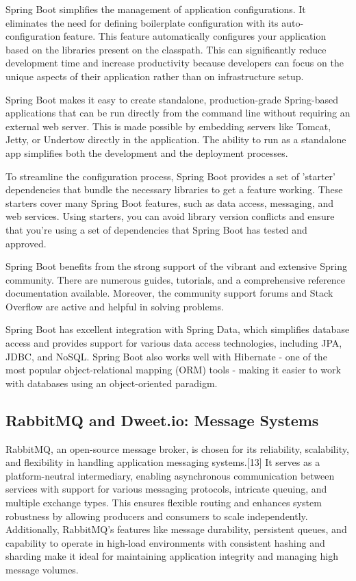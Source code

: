 Spring Boot simplifies the management of application configurations. 
It eliminates the need for defining boilerplate configuration with its auto-configuration feature.
This feature automatically configures your application based on the libraries present on the classpath. 
This can significantly reduce development time and increase productivity because developers can focus on the unique aspects of their application rather than on infrastructure setup. 

Spring Boot makes it easy to create standalone, production-grade Spring-based applications that can be run directly from the command line without requiring an external web server. 
This is made possible by embedding servers like Tomcat, Jetty, or Undertow directly in the application. 
The ability to run as a standalone app simplifies both the development and the deployment processes.

To streamline the configuration process, Spring Boot provides a set of 'starter' dependencies that bundle the necessary libraries to get a feature working. 
These starters cover many Spring Boot features, such as data access, messaging, and web services. 
Using starters, you can avoid library version conflicts and ensure that you're using a set of dependencies that Spring Boot has tested and approved.

Spring Boot benefits from the strong support of the vibrant and extensive Spring community. 
There are numerous guides, tutorials, and a comprehensive reference documentation available. 
Moreover, the community support forums and Stack Overflow are active and helpful in solving problems.

Spring Boot has excellent integration with Spring Data, which simplifies database access and provides support for various data access technologies, including JPA, JDBC, and NoSQL. 
Spring Boot also works well with Hibernate - one of the most popular object-relational mapping (ORM) tools - making it easier to work with databases using an object-oriented paradigm.

\subsection{RabbitMQ and Dweet.io: Message Systems}

RabbitMQ, an open-source message broker, is chosen for its reliability, scalability, and flexibility in handling application messaging systems.[13] It serves as a platform-neutral intermediary, enabling asynchronous communication between services with support for various messaging protocols, intricate queuing, and multiple exchange types. This ensures flexible routing and enhances system robustness by allowing producers and consumers to scale independently. Additionally, RabbitMQ's features like message durability, persistent queues, and capability to operate in high-load environments with consistent hashing and sharding make it ideal for maintaining application integrity and managing high message volumes.

